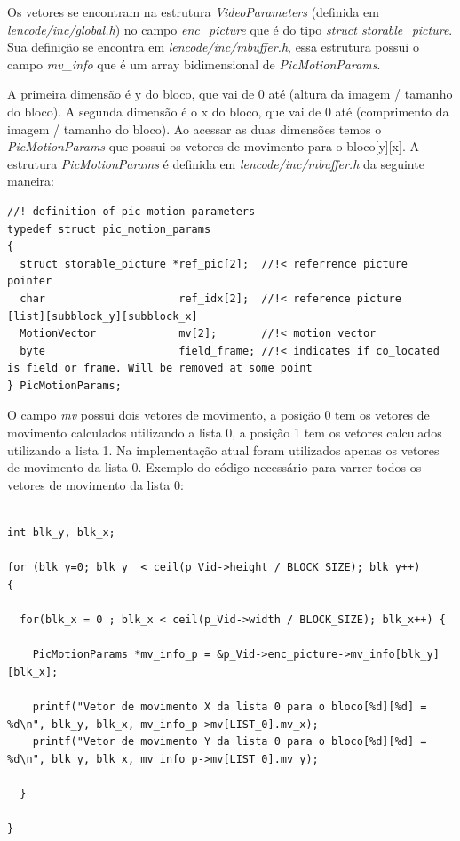 Os vetores se encontram na estrutura \textit{VideoParameters} (definida em \textit{lencode/inc/global.h}) no campo \textit{enc\_picture} que é do tipo \textit{struct storable\_picture}. Sua definição se encontra em \textit{lencode/inc/mbuffer.h}, essa estrutura possui o campo \textit{mv\_info} que é um array bidimensional de \textit{PicMotionParams}.

A primeira dimensão é y do bloco, que vai de 0 até (altura da imagem / tamanho do bloco). A segunda dimensão é o x do bloco, que vai de 0 até (comprimento da imagem / tamanho do bloco). Ao acessar as duas dimensões temos o \textit{PicMotionParams} que possui os vetores de movimento para o bloco[y][x]. A estrutura \textit{PicMotionParams} é definida em \textit{lencode/inc/mbuffer.h} da seguinte maneira:

\begin{lstlisting}
//! definition of pic motion parameters
typedef struct pic_motion_params
{
  struct storable_picture *ref_pic[2];  //!< referrence picture pointer
  char                     ref_idx[2];  //!< reference picture   [list][subblock_y][subblock_x]
  MotionVector             mv[2];       //!< motion vector  
  byte                     field_frame; //!< indicates if co_located is field or frame. Will be removed at some point
} PicMotionParams;

\end{lstlisting}


O campo \textit{mv} possui dois vetores de movimento, a posição 0 tem os vetores de movimento calculados utilizando a lista 0, a posição 1 tem os vetores calculados utilizando a lista 1. Na implementação atual foram utilizados apenas os vetores de movimento da lista 0. Exemplo do código necessário para varrer todos os vetores de movimento da lista 0:


\begin{lstlisting}

int blk_y, blk_x;
  
for (blk_y=0; blk_y  < ceil(p_Vid->height / BLOCK_SIZE); blk_y++)
{

  for(blk_x = 0 ; blk_x < ceil(p_Vid->width / BLOCK_SIZE); blk_x++) {

    PicMotionParams *mv_info_p = &p_Vid->enc_picture->mv_info[blk_y][blk_x];

    printf("Vetor de movimento X da lista 0 para o bloco[%d][%d] = %d\n", blk_y, blk_x, mv_info_p->mv[LIST_0].mv_x);
    printf("Vetor de movimento Y da lista 0 para o bloco[%d][%d] = %d\n", blk_y, blk_x, mv_info_p->mv[LIST_0].mv_y);

  }

}

\end{lstlisting}


